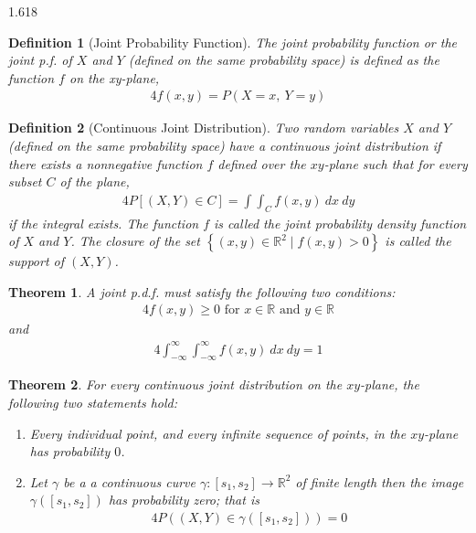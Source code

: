 \documentclass[11pt, oneside]{book}   	%
\newtheorem{definition}{Definition}[chapter]
\newtheorem{theorem}{Theorem}[chapter]
\newcommand{\set}[1]{\left\{#1\right\}}
\begin{document}
\begin{spacing}{1.618}
		\begin{definition}[Joint Probability Function]
			The \emph{joint probability function} or the \emph{joint p.f.} of $X$ and $Y$ (defined on the same probability space) is defined as the function $f$ on the \emph{xy}-plane,
			\begin{alignat}{4}
				f(x, y)=P(X = x, ~Y = y)
			\end{alignat}
		\end{definition}


		\begin{definition}[Continuous Joint Distribution]
			Two random variables $X$ and $Y$ (defined on the same probability space) have a \emph{continuous joint distribution} if there exists a nonnegative function $f$ defined over the $xy$-plane such that for every subset $C$ of the plane,
			\begin{alignat}{4}
				P[(X, Y)\in C] = \int\int_C f(x, y)~dx~dy
			\end{alignat}
			if the integral exists. The function $f$ is called the \emph{joint probability density function} of $X$ and $Y$. The closure of the set $\set{(x, y)\in\mathbb{R}^2\mid f(x, y)>0}$ is called the \emph{support} of $(X, Y)$. 
		\end{definition}
		
		\begin{theorem}
			A joint p.d.f. must satisfy the following two conditions:
			\begin{alignat}{4}
				f(x, y)\geq 0 \textrm{ for } x\in\mathbb{R} \textrm{ and } y\in\mathbb{R}
			\end{alignat}
			and
			\begin{alignat}{4}
				\int_{-\infty}^\infty \int_{-\infty}^\infty f(x, y)~dx~dy = 1
			\end{alignat}
		\end{theorem}
		
		\begin{theorem}
			For every continuous joint distribution on the $xy$-plane, the following two statements hold:
			\begin{enumerate}
				\item Every individual point, and every infinite sequence of points, in the $xy$-plane has probability $0$.
				\item Let $\gamma$ be a a continuous curve $\gamma: [s_1, s_2]\to \mathbb{R}^2$ of finite length then the image $\gamma([s_1, s_2])$ has probability zero; that is
				\begin{alignat}{4}
					P( (X, Y)\in\gamma([s_1, s_2])) = 0
				\end{alignat}
			\end{enumerate}
		\end{theorem}
		

\end{spacing}
\end{document}
